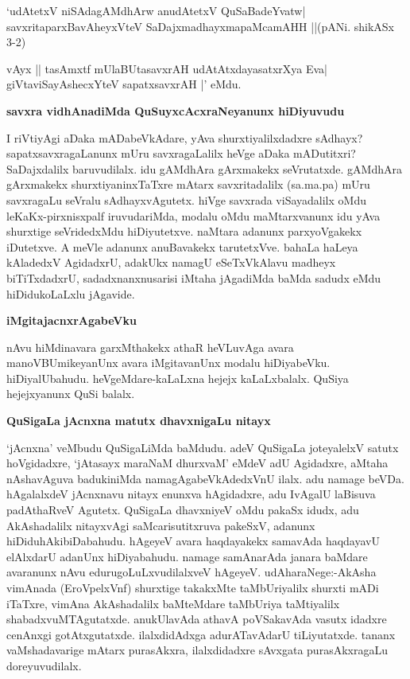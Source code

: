 \begin{shloka}
`udAtetxV niSAdagAMdhArw anudAtetxV QuSaBadeYvatw|\\\label{122}
savxritaparxBavAheyxVteV SaDajxmadhayxmapaMcamAHH ||\hfill{(pANi. shikASx 3-2)}
\end{shloka}

\begin{shloka}
vAyx || tasAmxtf mUlaBUtasavxrAH udAtAtxdayasatxrXya Eva|\\
giVtaviSayAshecxYteV sapatxsavxrAH |' eMdu.
\end{shloka}

{\bigskip
\noindent
{\large\bf savxra vidhAnadiMda QuSuyxcAcxraNeyanunx hiDiyuvudu}}\label{page122}
\medskip

\noindent
I riVtiyAgi aDaka mADabeVkAdare, yAva shurxtiyalilxdadxre sAdhayx? sapatxsavxragaLanunx mUru savxra\-gaLalilx heVge aDaka mADutitxri? SaDajxdalilx baruvudilalx. idu gAMdhAra gArxmakekx seVrutatxde. gAMdhAra gArxmakekx shurxti\-yaninx\-TaTxre mAtarx savxritadalilx (sa.ma.pa) mUru savxragaLu seVralu sAdhayxvAgutetx. hiVge savxrada viSaya\-dalilx oMdu leKaKx-pirxnisxpalf iruvudariMda, modalu oMdu maMtarxvanunx idu yAva shurxtige seVridedxMdu hiDiyutetxve. naMtara adanunx parxyoVgakekx iDutetxve. A meVle adanunx anuBavakekx tarutetxVve. bahaLa haLeya kAladedxV AgidadxrU, adakUkx namagU eSeTxVkAlavu madheyx biTiTxdadxrU, sadadxnanxnusarisi iMta\-ha jAgadiMda baMda sadudx eMdu hiDidukoLaLxlu jAgavide.

{\medskip
\noindent
{\large\bf iMgitajacnxrAgabeVku}}
\medskip

\noindent
nAvu hiMdinavara garxMthakekx athaR heVLuvAga avara manoVBUmikeyanUnx avara iMgitavanUnx moda\-lu hiDiyabeVku. hiDiyalUbahudu. heVgeMdare-kaLaLxna hejejx kaLaLxbalalx. QuSiya hejejxyanunx QuSi balalx.

{\medskip
\noindent
{\large\bf QuSigaLa jAcnxna matutx dhavxnigaLu nitayx}}\label{page122}
\medskip

\noindent
`jAcnxna' veMbudu QuSigaLiMda baMdudu. adeV QuSigaLa joteyalelxV satutx 
hoVgidadxre, `jAtasayx mara\-NaM dhurxvaM'\label{122} eMdeV adU Agidadxre, aMtaha nAshavAguva badukiniMda namagAgabeVkAdedxVnU ilalx. adu namage beVDa. hAgalalxdeV jAcnxnavu nitayx enunxva hAgidadxre, adu IvAgalU laBisuva padA\-thaRveV Agutetx. QuSigaLa dhavxniyeV oMdu pakaSx idudx, adu AkAshadalilx nitayxvAgi saMcarisutitxruva pakeSxV, adanunx\- hiDidu\-hAki\-biDa\-bahudu. hAgeyeV avara haqdayakekx samavAda haqdayavU elAlxdarU adanUnx\-
hiDi\-yabahudu. namage samAnarAda janara baMdare avaranunx nAvu edurugoLuLxvudilalxveV hAgeyeV. udA\-haraNege:-AkAsha vimAnada (EroVpelxVnf) shurxtige takakxMte taMbUriyalilx shurxti mADi iTaTxre, vimAna AkAsha\-dalilx baMteMdare taMbUriya taMtiyalilx shabadxvuMTAgutatxde. anukUlavAda athavA poVSaka\-vAda vasutx idadxre cenAnxgi gotAtxgutatxde. ilalxdidAdxga adurATavAdarU tiLiyutatxde. tananx vaMshadava\-rige mAtarx purasAkxra, ilalxdidadxre sAvxgata purasAkxragaLu doreyuvudilalx.

